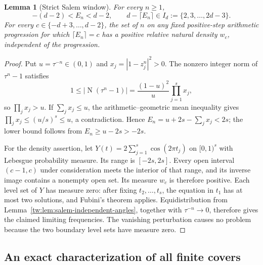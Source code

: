\documentclass[11pt,a4paper]{article}
\newtheorem{lemma}[theorem]{Lemma}
\theoremstyle{definition}
\theoremstyle{remark}
\numberwithin{equation}{section}
\begin{document}
\begin{lemma}[Strict Salem window]\label{tw:lem:sharp-salem-window}
For every $n\ge1$,
\[
 -(d-2)<E_n<d-2,\qquad
 d-\lceil E_n\rceil\in I_d:=\{2,3,\ldots,2d-3\}.
\]
For every $c\in\{-d+3,\ldots,d-2\}$, the set of $n$ on any fixed
positive-step arithmetic progression for which $\lceil E_n\rceil=c$
has a positive relative natural density $w_c$, independent of the
progression.
\end{lemma}
\begin{proof}
Put $u=\tau^{-n}\in(0,1)$ and $x_j=|1-z_j^n|^2>0$.  The nonzero
integer norm of $\tau^n-1$ satisfies
\[
 1\le\left|\operatorname{N}(\tau^n-1)\right|
   =\frac{(1-u)^2}{u}\prod_{j=1}^sx_j,
\]
so $\prod_jx_j>u$.  If $\sum_jx_j\le u$, the arithmetic--geometric
mean inequality gives $\prod_jx_j\le(u/s)^s\le u$, a contradiction.
Hence $E_n=u+2s-\sum_jx_j<2s$; the lower bound follows from
$E_n\ge u-2s>-2s$.

For the density assertion, let $Y(t)=2\sum_{j=1}^s\cos(2\pi t_j)$ on
$[0,1)^s$ with Lebesgue probability measure.  Its range is $[-2s,2s]$.
Every open interval $(c-1,c)$ under consideration meets the interior of
that range, and its inverse image contains a nonempty open set.  Its
measure $w_c$ is therefore positive.  Each level set of $Y$ has measure
zero: after fixing $t_2,\ldots,t_s$, the equation in $t_1$ has at most
two solutions, and Fubini's theorem applies.  Equidistribution from
Lemma~\ref{tw:lem:salem-independent-angles}, together with $\tau^{-n}\to0$,
therefore gives the claimed limiting frequencies.  The vanishing
perturbation causes no problem because the two boundary level sets have
measure zero.
\end{proof}

\subsection{An exact characterization of all finite covers}
\end{document}
